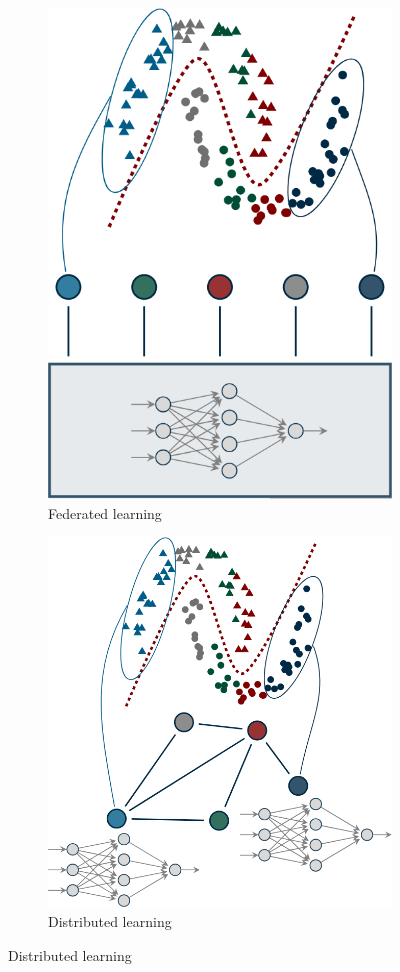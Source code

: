 \begin{figure}[H]
    \centering
    \begin{subfigure}{0.45\linewidth}
        \centering
        \includegraphics[width=0.55\linewidth]{./img/federated_learning.png}
        \caption{Federated learning}
    \end{subfigure}
    \begin{subfigure}{0.45\linewidth}
        \centering
        \includegraphics[width=0.7\linewidth]{./img/distributed_learning.png}
        \caption{Distributed learning}
    \end{subfigure}
\end{figure}



